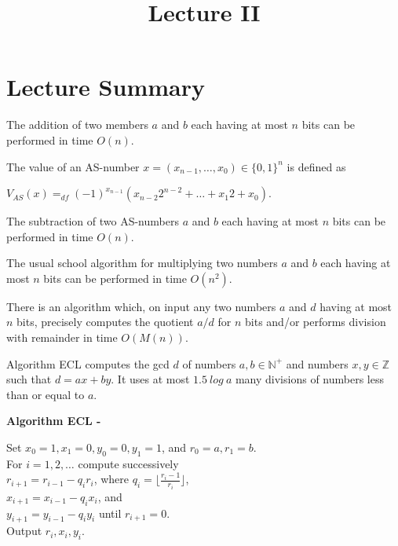 \documentclass[a4paper]{article}
\title{\vspace{-2cm}Lecture II\vspace{-2cm}}
\date{}
\begin{document}
\maketitle
\section{Lecture Summary}
\begin{theorem}
The addition of two members $a$ and $b$ each having at most $n$ bits can be performed in time $O(n)$.
\end{theorem}


\begin{definition}
The value of an AS-number $x = (x_{n-1}, \ldots , x_{0}) \in \lbrace 0,1 \rbrace^{n}$ is defined as
\begin{center}
$V_{AS}(x) =_{df} (-1)^{x_{n-1}}(x_{n-2}2^{n-2}+ \ldots + x_{1}2 + x_{0})$.
\end{center}
\end{definition}


\begin{theorem}
The subtraction of two AS-numbers $a$ and $b$ each having at most $n$ bits can be performed in time $O(n)$.
\end{theorem}


\begin{theorem}
The usual school algorithm for multiplying two numbers $a$ and $b$ each having at most $n$ bits can be performed in time $O(n^{2})$.
\end{theorem}


\begin{theorem}
There is an algorithm which, on input any two numbers $a$ and $d$ having at most $n$ bits, precisely computes the quotient $a/d$ for $n$ bits and/or performs division with remainder in time $O(M(n))$.
\end{theorem}


\begin{theorem}
Algorithm ECL computes the gcd $d$ of numbers $a, b \in \mathbb{N}^{+}$ and numbers $x, y \in \mathbb{Z}$ such that $d = ax + by$. It uses at most $1.5\ log \ a$ many divisions of numbers less than or equal to $a$.
\end{theorem}


\begin{algorithm}
\textbf{Algorithm ECL -}
\begin{center}
Set $x_{0} = 1, x_{1} = 0, y_{0} = 0, y_{1} = 1$, and $r_{0} = a, r_{1} = b$. \\
For $i = 1, 2, \ldots$ compute successively \\
$r_{i+1} = r_{i-1} - q_{i}r_{i}$, where $q_{i} = \lfloor \frac{r_{i}-1}{r_{i}} \rfloor$, \\
$x_{i+1} = x_{i-1} - q_{i}x_{i}$, and \\
$y_{i+1} = y_{i - 1} - q_{i}y_{i}$ until $r_{i+1} = 0$. \\
Output $r_{i}, x_{i}, y_{i}$.
\end{center}
\end{algorithm}
\end{document}
